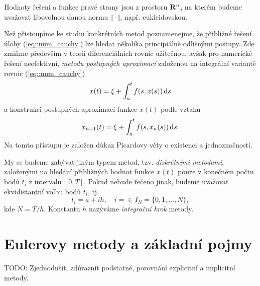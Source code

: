 \documentclass[a4paper, 12pt]{book}
\theoremstyle{definition}
\def\Real{{\rm\bf R}}
\def\d{\,{\rm d}}               %
\def\norm#1{\bigl\Vert#1\bigr\Vert} %
\def\todo#1{{\color{green}TODO:} #1}
\begin{document}
Hodnoty řešení a funkce pravé strany jsou z prostoru $\Real^n$, na kterém budeme uvažovat libovolnou danou normu $\norm{\cdot}$, např. eukleidovskou.

Než přistoupíme ke studiu konkrétních metod poznamenejme, 
že přibližné řešení úlohy (\ref{eq::num_cauchy}) lze hledat několika principiálně
odlišnými postupy. Zde zmiňme především v teorii diferenciálních rovnic 
užitečnou, avšak pro numerické řešení neefektivní, {\em metodu postupných
aproximací} založenou na integrální variantě rovnic (\ref{eq::num_cauchy})
\begin{displaymath}
x(t)=\xi + \int_a^t f(s,x(s))\d s
\end{displaymath}
a konstrukci postupných aproximací funkce $x(t)$ podle vztahu
\begin{displaymath}
x_{n+1}(t)=\xi + \int_a^t f(s,x_n(s))\d s.
\end{displaymath}
Na tomto přístupu je založen důkaz Picardovy věty o existenci a jednoznačnosti.

My se budeme zabývat jiným typem metod, tzv. {\em diskrétními 
metodami}, založenými na hledání přibližných hodnot funkce $x(t)$ pouze
v konečném počtu bodů $t_i$ z intervalu $[ 0,T ]$. 
Pokud nebude řečeno jinak, budeme uvažovat ekvidistantní volbu bodů $t_i$, tj.
\begin{displaymath}
t_i=a+ih,\quad i=\in I_N=\{0,1,\dots, N\},
\end{displaymath}
kde $N=T/h$.
Konstantu $h$ nazýváme {\em integrační krok} metody.


\section{Eulerovy metody a základní pojmy}
\todo{Zjednodušit, zdůraznit podstatné, porovnání explicitní a implicitní metody.}

\end{document}
